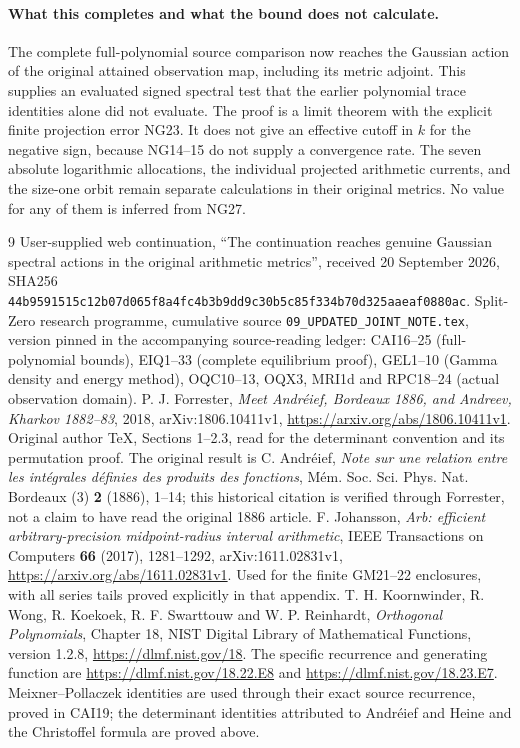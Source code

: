 \documentclass[11pt]{article}
\begin{document}
\paragraph{What this completes and what the bound does not calculate.}
The complete full-polynomial source comparison now reaches the Gaussian
action of the original attained observation map, including its metric
adjoint. This supplies an evaluated signed spectral test that the earlier
polynomial trace identities alone did not evaluate. The proof is a limit
theorem with the explicit finite projection error NG23. It does not give
an effective cutoff in $k$ for the negative sign, because NG14--15 do not
supply a convergence rate. The seven absolute logarithmic allocations,
the individual projected arithmetic currents, and the size-one orbit
remain separate calculations in their original metrics. No value for
any of them is inferred from NG27.

\begin{thebibliography}{9}
 User-supplied web continuation, ``The continuation reaches
genuine Gaussian spectral actions in the original arithmetic metrics'',
received 20 September 2026, SHA256
\texttt{44b9591515c12b07d065f8a4fc4b3b9dd9c30b5c85f334b70d325aaeaf0880ac}.
 Split-Zero research programme, cumulative source
\texttt{09\_UPDATED\_JOINT\_NOTE.tex}, version pinned in the accompanying
source-reading ledger: CAI16--25 (full-polynomial bounds), EIQ1--33
(complete equilibrium proof), GEL1--10 (Gamma density and energy method),
OQC10--13, OQX3, MRI1d and RPC18--24 (actual observation domain).
 P. J. Forrester, \emph{Meet Andr\'eief, Bordeaux 1886,
and Andreev, Kharkov 1882--83}, 2018, arXiv:1806.10411v1,
\url{https://arxiv.org/abs/1806.10411v1}. Original author TeX, Sections
1--2.3, read for the determinant convention and its permutation proof.
The original result is C. Andr\'eief, \emph{Note sur une relation entre
les int\'egrales d\'efinies des produits des fonctions},
M\'em. Soc. Sci. Phys. Nat. Bordeaux (3) \textbf{2} (1886), 1--14;
this historical citation is verified through Forrester, not a claim
to have read the original 1886 article.
 F. Johansson, \emph{Arb: efficient arbitrary-precision
midpoint-radius interval arithmetic}, IEEE Transactions on Computers
\textbf{66} (2017), 1281--1292, arXiv:1611.02831v1,
\url{https://arxiv.org/abs/1611.02831v1}. Used for the finite GM21--22
enclosures, with all series tails proved explicitly in that appendix.
 T. H. Koornwinder, R. Wong, R. Koekoek,
R. F. Swarttouw and W. P. Reinhardt, \emph{Orthogonal Polynomials},
Chapter 18, NIST Digital Library of Mathematical Functions, version 1.2.8,
\url{https://dlmf.nist.gov/18}. The specific recurrence and generating
function are \url{https://dlmf.nist.gov/18.22.E8} and
\url{https://dlmf.nist.gov/18.23.E7}.
Meixner--Pollaczek identities are used through their exact source
recurrence, proved in CAI19; the determinant identities attributed to
Andr\'eief and Heine and the Christoffel formula are proved above.
\end{thebibliography}
\end{document}
